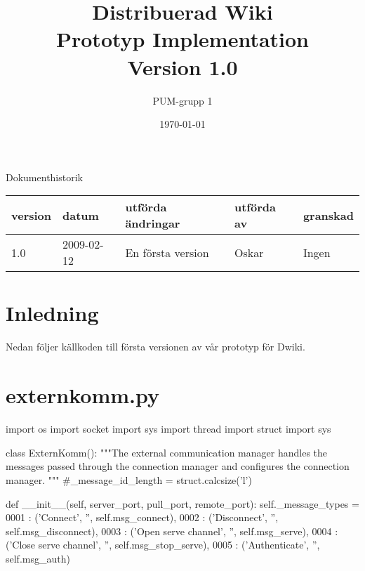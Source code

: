 

\ifpdf
\else
\fi

\title{Distribuerad Wiki \\ Prototyp Implementation \\ Version 1.0}
\author{PUM-grupp 1}
\date{\today}



\maketitle

\thispagestyle{empty}

\newpage

{\centering \Large{Dokumenthistorik\\}}

\vspace{10pt}
\begin{tabularx}{\textwidth}{ |l|l|X|l|l| }
  \hline
    \textbf{version} & \textbf{datum} & \textbf{utförda ändringar} & \textbf{utförda av} & \textbf{granskad} \\
	\hline 
  1.0 & 2009-02-12 &  En första version  & Oskar & Ingen   \\
  \hline
\end{tabularx}

\newpage

\setcounter{tocdepth}{3}
\tableofcontents
\newpage
\section{Inledning}
Nedan följer källkoden till första versionen av vår prototyp för Dwiki. 
\section{externkomm.py}
import os
import socket
import sys
import thread
import struct
import sys


class ExternKomm():
    """The external communication manager handles the messages passed through
    the connection manager and configures the connection manager.
    """
    #_message_id_length = struct.calcsize('l')

    def __init__(self, server_port, pull_port, remote_port):
        self._message_types = {
            0001 : ('Connect', '', self.msg_connect),
            0002 : ('Disconnect', '', self.msg_disconnect),
            0003 : ('Open serve channel', '', self.msg_serve),
            0004 : ('Close serve channel', '', self.msg_stop_serve),
            0005 : ('Authenticate', '', self.msg_auth)
            }

